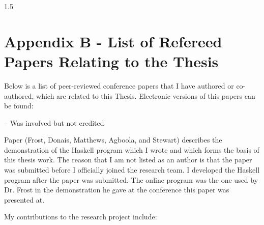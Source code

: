 \documentclass[fleqn, oneside, 12pt]{book}
\theoremstyle{definitionsty}
\newcommand{\uwinonehalfspacelen}{1.5}
\newcommand{\uwindefaultspacelen}{\uwinonehalfspacelen}
\newenvironment{uwindefaultspaceenv}%
{\begin{spacing}{\uwindefaultspacelen}}%
	{\end{spacing}}
\begin{document}
\begin{uwindefaultspaceenv}

\section*{Appendix B - List of Refereed Papers Relating to the Thesis}
\label{appendix:b}

Below is a list of peer-reviewed conference papers that I have authored or co-authored, which are related to this Thesis.  Electronic versions of this papers can be found: %



\cite{donais2013system} 

\cite{peelar2017windsor} 

\cite{peelar2018toolpath} 

\cite{frost2014demonstration}  -- Was involved but not credited

Paper \cite{frost2014demonstration} (Frost, Donais, Matthews, Agboola, and Stewart) describes the demonstration of the Haskell program which I wrote and which forms the basis of this thesis work.  The reason that I am not listed as an author is that the paper was submitted before I officially joined the research team.  I developed the Haskell program after the paper was submitted.  The online program was the one used by Dr. Frost in the demonstration he gave at the conference this paper was presented at.

My contributions to the research project include:


\end{uwindefaultspaceenv}
\end{document}
